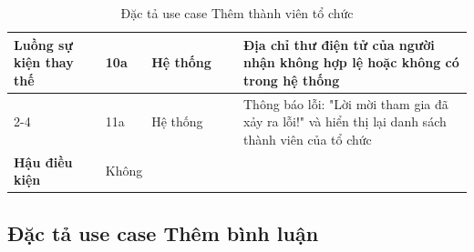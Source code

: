 \documentclass[../DoAn.tex]{subfiles}
\begin{document}
\begin{table}[ht]
\begin{tabular}{| p{0.2\linewidth} | p{0.1\linewidth} | p{0.2\linewidth} | p{0.5\linewidth} |}
        \multirow{4}{\linewidth}{\textbf{Luồng sự kiện thay thế}}    & \multicolumn{1}{p{0.1\linewidth}|}{10a}                                                      & \multicolumn{1}{p{0.2\linewidth}|}{Hệ thống}               & \multicolumn{1}{p{0.5\linewidth}|}{Địa chỉ thư điện tử của người nhận không hợp lệ hoặc không có trong hệ thống}                      \\ \cline{2-4}
                                                                     & \multicolumn{1}{p{0.1\linewidth}|}{11a}                                                      & \multicolumn{1}{p{0.2\linewidth}|}{Hệ thống}               & \multicolumn{1}{p{0.5\linewidth}|}{Thông báo lỗi: "Lời mời tham gia đã xảy ra lỗi!" và hiển thị lại danh sách thành viên của tổ chức} \\ \hline

        \textbf{Hậu điều kiện}                                       & \multicolumn{3}{p{0.1\linewidth}|}{Không}                                                                                                                                                                                                                                                         \\ \hline
    \end{tabular}%
    \renewcommand{\arraystretch}{1}
    \caption{Đặc tả use case Thêm thành viên tổ chức}
    \label{tab:UC05}
\end{table}

\newpage

\subsection{Đặc tả use case Thêm bình luận}
\label{subsection:2.3.6}
\end{document}
